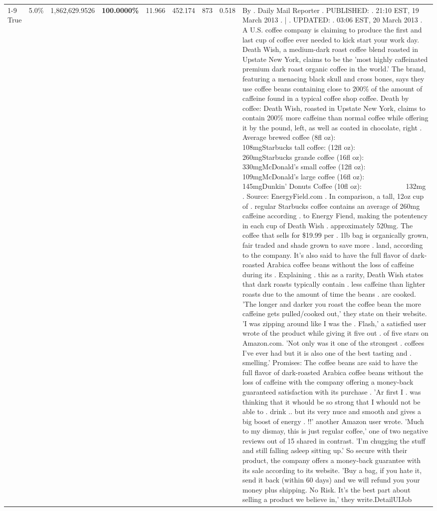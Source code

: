 \begin{table}[H]
{\begin{tabular}{lllrlllll}
\cline{1-9}
True & 5.0\% & 1,862,629.9526 & \bfseries \color{red} 100.0000\% & 11.966 & 452.174 & 873 & 0.518 & By . Daily Mail Reporter . PUBLISHED: . 21:10 EST, 19 March 2013 . | . UPDATED: . 03:06 EST, 20 March 2013 . A U.S. coffee company is claiming to produce the first and last cup of coffee ever needed to kick start your work day. Death Wish, a medium-dark roast coffee blend roasted in Upstate New York, claims to be the 'most highly caffeinated premium dark roast organic coffee in the world.' The brand, featuring a menacing black skull and cross bones, says they use coffee beans containing close to 200\% of the amount of caffeine found in a typical coffee shop coffee. Death by coffee: Death Wish, roasted in Upstate New York, claims to contain 200\% more caffeine than normal coffee while offering it by the pound, left, as well as coated in chocolate, right . Average brewed coffee (8fl oz):              108mgStarbucks tall coffee: (12fl oz):                260mgStarbucks grande coffee (16fl oz):         330mgMcDonald's small coffee (12fl oz):           109mgMcDonald's large coffee (16fl oz):           145mgDunkin' Donuts Coffee (10fl oz):             132mg . Source: EnergyField.com . In comparison, a tall, 12oz cup of . regular Starbucks coffee contains an average of 260mg caffeine according . to Energy Fiend, making the potentency in each cup of Death Wish . approximately 520mg. The coffee that sells for \$19.99 per . 1lb bag is organically grown, fair traded and shade grown to save more . land, according to the company. It's also said to have the full flavor of dark-roasted Arabica coffee beans without the loss of caffeine during its . Explaining . this as a rarity, Death Wish states that dark roasts typically contain . less caffeine than lighter roasts due to the amount of time the beans . are cooked. 'The longer and darker you roast the coffee bean the more caffeine gets pulled/cooked out,' they state on their website. 'I was zipping around like I was the . Flash,' a satisfied user wrote of the product while giving it five out . of five stars on Amazon.com. 'Not only was it one of the strongest . coffees I've ever had but it is also one of the best tasting and . smelling.’ Promises: The coffee beans are said to have the full flavor of dark-roasted Arabica coffee beans without the loss of caffeine with the company offering a money-back guaranteed satisfaction with its purchase . 'Ar first I . was thinking that it whould be so strong that I whould not be able to . drink .. but its very nuce and smooth and gives a big boost of energy . !!' another Amazon user wrote. 'Much to my dismay, this is just regular coffee,' one of two negative reviews out of 15 shared in contrast. 'I'm chugging the stuff and still falling asleep sitting up.' So secure with their product, the company offers a money-back guarantee with its sale according to its website. 'Buy a bag, if you hate it, send it back (within 60 days) and we will refund you your money plus shipping. No Risk. It’s the best part about selling a product we believe in,' they write.DetailUIJob \\

\end{tabular}}
\end{table}
